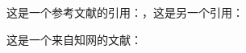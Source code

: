 \documentclass{ctexart}
\begin{document}
%				
%					
	
	这是一个参考文献的引用：\cite{mittelbach2004}，这是另一个引用：\cite{刘伟2020疫情冲击下的}
	
	这是一个来自知网的文献：\cite{_2020_2020}
	
	\nocite{*} %
	
\end{document}
